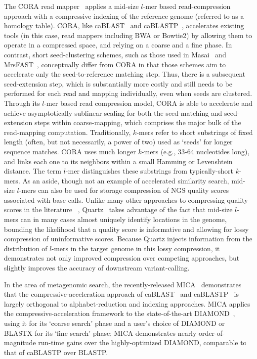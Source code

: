 \documentclass{acm_proc_article-sp}
\begin{document}
The CORA read mapper~\cite{yorukoglu2015compressive} applies a mid-size $l$-mer based 
read-compression approach with a compressive indexing of the reference genome
(referred to as a homology table).
CORA, like caBLAST~\cite{loh2012compressive} and 
caBLASTP~\cite{daniels2013compressive}, accelerates existing tools (in this 
case, read
mappers including BWA or Bowtie2) by allowing them to operate in a compressed
space, and relying on a coarse and a fine phase.
In contrast, short seed-clustering schemes, such as those used in Masai~\cite{siragusa2013fast} and 
MrsFAST~\cite{berger2013computational}, conceptually differ from CORA in that those 
schemes aim to accelerate only the seed-to-reference matching step.
Thus, there is a subsequent seed-extension step, which is substantially more 
costly and still needs to be performed for each read and mapping individually, 
even when seeds are clustered. 
Through its $l$-mer based read compression model, CORA is able to accelerate 
and 
achieve asymptotically sublinear scaling for both the seed-matching and 
seed-extension steps within coarse-mapping, which comprises the major bulk of 
the read-mapping computation.
Traditionally, $k$-mers refer to short substrings of fixed length (often, but 
not necessarily, a power of two) used as `seeds' for longer sequence matches.
CORA uses much longer $k$-mers (e.g., 33-64 nucleotides long), and links each 
one to its neighbors within a small Hamming or Levenshtein distance.
The term $l$-mer distinguishes these substrings from typically-short $k$-mers.
As an aside, though not an example of accelerated similarity search, mid-size $l$-mers
can also be used for storage compression of NGS quality scores associated with base calls.
Unlike many other approaches to compressing quality scores in the literature
~\cite{janin2013adaptive,bonfield2013compression,ochoa2013qualcomp},
Quartz~\cite{yu2015quality} takes advantage of the fact that mid-size $l$-mers can in many cases almost uniquely identify locations in the genome,
bounding the likelihood that a quality score is informative and allowing for lossy compression of uninformative scores.
Because Quartz injects information from the distribution of $l$-mers in the target genome in this lossy compression, it demonstrates not only improved compression over competing
approaches, but slightly improves the accuracy of downstream variant-calling.

In the area of metagenomic search,
the recently-released MICA~\cite{yu2015entropy} demonstrates that the 
compressive-acceleration approach of 
caBLAST~\cite{loh2012compressive} and caBLASTP~\cite{daniels2013compressive} is 
largely orthogonal to alphabet-reduction and indexing approaches.
MICA applies the compressive-acceleration framework to the
state-of-the-art DIAMOND~\cite{buchfink2014fast}, using it
for its `coarse search' phase and a user's choice of DIAMOND or BLASTX for its
`fine search' phase; MICA demonstrates nearly order-of-magnitude run-time gains over the highly-optimized DIAMOND, comparable to that of caBLASTP over BLASTP.
\end{document}
